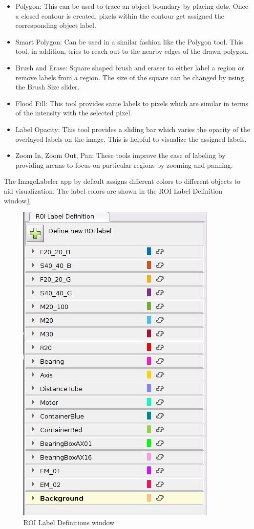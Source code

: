 	\begin{itemize}
		\item Polygon: This can be used to trace an object boundary by placing dots. Once a closed contour is created, pixels within the contour get assigned the corresponding object label.
		\item Smart Polygon: Can be used in a similar fashion like the Polygon tool. This tool, in addition, tries to reach out to the nearby edges of the drawn polygon.
		\item Brush and Erase: Square shaped brush and eraser to either label a region or remove labels from a region. The size of the square can be changed by using the Brush Size slider.
		\item Flood Fill: This tool provides same labels to pixels which are similar in terms of the intensity with the selected pixel.
		\item Label Opacity: This tool provides a sliding bar which varies the opacity of the overlayed labels on the image. This is helpful to visualize the assigned labels.
		\item Zoom In, Zoom Out, Pan: These tools improve the ease of labeling by providing means to focus on particular regions by zooming and panning.
	\end{itemize}
	
The ImageLabeler app by default assigns different colors to different objects to aid visualization. The label colors are shown in the ROI Label Definition window\ref{Fig:ROI}.
	\begin{figure}[htb!]
		\centering
		\includegraphics[scale=0.6]{images/roi_label_defintions}
		\caption{ROI Label Definitions window}
		\label{Fig:ROI}
	\end{figure}
	
